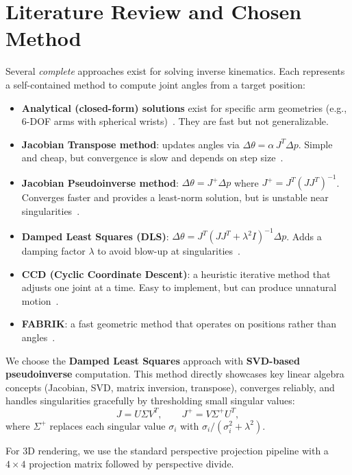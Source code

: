 \documentclass[11pt]{article}
\begin{document}
\section{Literature Review and Chosen Method}

Several \textit{complete} approaches exist for solving inverse kinematics. Each represents a self-contained method to compute joint angles from a target position:

\begin{itemize}[nosep]
    \item \textbf{Analytical (closed-form) solutions} exist for specific arm geometries (e.g., 6-DOF arms with spherical wrists)~\cite{roboticworx}. They are fast but not generalizable.
    \item \textbf{Jacobian Transpose method}: updates angles via $\Delta\theta = \alpha \, J^T \Delta p$. Simple and cheap, but convergence is slow and depends on step size~\cite{buss2004}.
    \item \textbf{Jacobian Pseudoinverse method}: $\Delta\theta = J^+ \Delta p$ where $J^+ = J^T(JJ^T)^{-1}$. Converges faster and provides a least-norm solution, but is unstable near singularities~\cite{buss2004}.
    \item \textbf{Damped Least Squares (DLS)}: $\Delta\theta = J^T(JJ^T + \lambda^2 I)^{-1}\Delta p$. Adds a damping factor $\lambda$ to avoid blow-up at singularities~\cite{buss2004}.
    \item \textbf{CCD (Cyclic Coordinate Descent)}: a heuristic iterative method that adjusts one joint at a time. Easy to implement, but can produce unnatural motion~\cite{buss2004}.
    \item \textbf{FABRIK}: a fast geometric method that operates on positions rather than angles~\cite{buss2004}.
\end{itemize}

We choose the \textbf{Damped Least Squares} approach with \textbf{SVD-based pseudoinverse} computation. This method directly showcases key linear algebra concepts (Jacobian, SVD, matrix inversion, transpose), converges reliably, and handles singularities gracefully by thresholding small singular values:
\[
J = U \Sigma V^T, \qquad J^+ = V \Sigma^+ U^T,
\]
where $\Sigma^+$ replaces each singular value $\sigma_i$ with $\sigma_i / (\sigma_i^2 + \lambda^2)$.

For 3D rendering, we use the standard perspective projection pipeline with a $4\times 4$ projection matrix followed by perspective divide.
\end{document}
